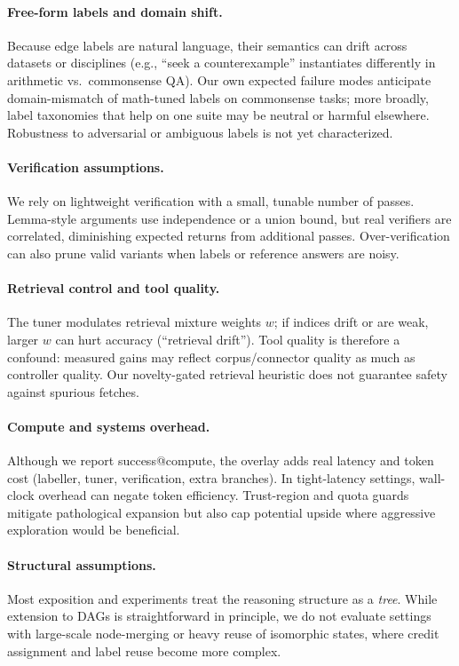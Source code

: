\documentclass{article}
\theoremstyle{plain}
\theoremstyle{definition}
\theoremstyle{remark}
\begin{document}
\paragraph{Free-form labels and domain shift.}
Because edge labels are natural language, their semantics can drift across datasets or disciplines (e.g., ``seek a counterexample'' instantiates differently in arithmetic vs.\ commonsense QA). Our own expected failure modes anticipate domain-mismatch of math-tuned labels on commonsense tasks; more broadly, label taxonomies that help on one suite may be neutral or harmful elsewhere. Robustness to adversarial or ambiguous labels is not yet characterized.

\paragraph{Verification assumptions.}
We rely on lightweight verification with a small, tunable number of passes. Lemma-style arguments use independence or a union bound, but real verifiers are correlated, diminishing expected returns from additional passes. Over-verification can also prune valid variants when labels or reference answers are noisy.

\paragraph{Retrieval control and tool quality.}
The tuner modulates retrieval mixture weights $w$; if indices drift or are weak, larger $w$ can hurt accuracy (``retrieval drift''). Tool quality is therefore a confound: measured gains may reflect corpus/connector quality as much as controller quality. Our novelty-gated retrieval heuristic does not guarantee safety against spurious fetches.

\paragraph{Compute and systems overhead.}
Although we report success@compute, the overlay adds real latency and token cost (labeller, tuner, verification, extra branches). In tight-latency settings, wall-clock overhead can negate token efficiency. Trust-region and quota guards mitigate pathological expansion but also cap potential upside where aggressive exploration would be beneficial.

\paragraph{Structural assumptions.}
Most exposition and experiments treat the reasoning structure as a \emph{tree}. While extension to DAGs is straightforward in principle, we do not evaluate settings with large-scale node-merging or heavy reuse of isomorphic states, where credit assignment and label reuse become more complex.
\end{document}
